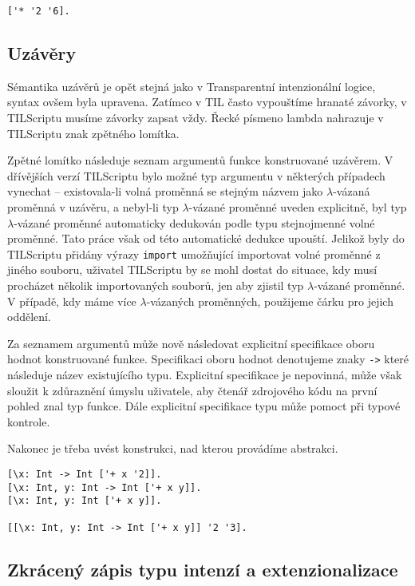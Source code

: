 \begin{lstlisting}[caption={Příklad využití kompozice}]
['* '2 '6].
\end{lstlisting}

\subsection{Uzávěry}

Sémantika uzávěrů je opět stejná jako v Transparentní intenzionální logice, syntax ovšem byla
upravena. Zatímco v TIL často vypouštíme hranaté závorky, v TILScriptu musíme závorky zapsat vždy.
Řecké písmeno lambda nahrazuje v TILScriptu znak zpětného lomítka.

Zpětné lomítko následuje seznam argumentů funkce konstruované uzávěrem. V dřívějších verzí
TILScriptu bylo možné typ argumentu v některých případech vynechat -- existovala-li volná proměnná
se stejným názvem jako $\lambda$-vázaná proměnná v uzávěru, a nebyl-li typ $\lambda$-vázané
proměnné uveden explicitně, byl typ $\lambda$-vázané proměnné automaticky dedukován podle typu
stejnojmenné volné proměnné. Tato práce však od této automatické dedukce upouští. Jelikož byly
do TILScriptu přidány výrazy \lstinline{import} umožňující importovat volné proměnné z jiného
souboru, uživatel TILScriptu by se mohl dostat do situace, kdy musí procházet několik importovaných
souborů, jen aby zjistil typ $\lambda$-vázané proměnné. V případě, kdy máme více $\lambda$-vázaných
proměnných, použijeme čárku pro jejich oddělení.

Za seznamem argumentů může nově následovat explicitní specifikace oboru hodnot konstruované funkce.
Specifikaci oboru hodnot denotujeme znaky \lstinline{->} které následuje název existujícího typu.
Explicitní specifikace je nepovinná, může však sloužit k zdůraznění úmyslu uživatele, aby čtenář
zdrojového kódu na první pohled znal typ funkce. Dále explicitní specifikace typu může pomoct při
typové kontrole.

Nakonec je třeba uvést konstrukci, nad kterou provádíme abstrakci.

\begin{lstlisting}[caption={Příklad využití uzávěrů}]
[\x: Int -> Int ['+ x '2]].
[\x: Int, y: Int -> Int ['+ x y]].
[\x: Int, y: Int ['+ x y]].

[[\x: Int, y: Int -> Int ['+ x y]] '2 '3].
\end{lstlisting}

\subsection{Zkrácený zápis typu intenzí a extenzionalizace}

